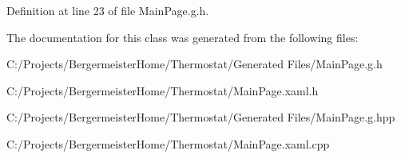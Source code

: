 Definition at line 23 of file Main\+Page.\+g.\+h.



The documentation for this class was generated from the following files\+:\begin{DoxyCompactItemize}
\item 
C\+:/\+Projects/\+Bergermeister\+Home/\+Thermostat/\+Generated Files/Main\+Page.\+g.\+h\item 
C\+:/\+Projects/\+Bergermeister\+Home/\+Thermostat/Main\+Page.\+xaml.\+h\item 
C\+:/\+Projects/\+Bergermeister\+Home/\+Thermostat/\+Generated Files/Main\+Page.\+g.\+hpp\item 
C\+:/\+Projects/\+Bergermeister\+Home/\+Thermostat/Main\+Page.\+xaml.\+cpp\end{DoxyCompactItemize}
